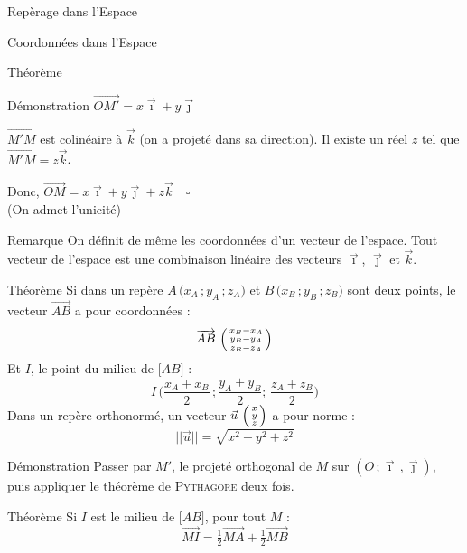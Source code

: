 \documentclass{coursbook}
\begin{document}
\begin{Gpartie}{Repèrage dans l'Espace}
\begin{Spartie}{Coordonnées dans l'Espace}
\begin{SSpartie}{Théorème}
\begin{SSSpartie}{Démonstration}
                    $\overrightarrow{OM'}=x\vec{\imath}+y\vec{\jmath}$

                    $\overrightarrow{M'M}$ est colinéaire à $\vec{k}$ (on a projeté dans sa direction). Il existe un réel $z$ tel que $\overrightarrow{M'M}=z\vec{k}$.

                    Donc, $\overrightarrow{OM}=x\vec{\imath}+y\vec{\jmath}+z\vec{k}\quad\square$ \\
                    (On admet l'unicité)
                \end{SSSpartie}
                \begin{SSSpartie}{Remarque} 
                    On définit de même les coordonnées d'un vecteur de l'espace. Tout vecteur de l'espace est une combinaison linéaire des vecteurs $\vec{\imath}$, $\vec{\jmath}$ et $\vec{k}$.
                \end{SSSpartie}
            \end{SSpartie}
            \begin{SSpartie}{Théorème} 
                Si dans un repère $A\,\big(x_A\,; y_A\,; z_A\big)$ et $B\,\big(x_B\,; y_B\,; z_B\big)$ sont deux points, le vecteur $\overrightarrow{AB}$ a pour coordonnées : 
                \[\overrightarrow{AB}~\begin{psmallmatrix} x_B-x_A \\ y_B-y_A \\ z_B-z_A \end{psmallmatrix}\]
                Et $I$, le point du milieu de $\big[AB\big]$ :
                \[I\,\Bigg(\frac{x_A+x_B}{2}\,;\frac{y_A+y_B}{2};\,\frac{z_A+z_B}{2}\Bigg)\]
                Dans un repère orthonormé, un vecteur $\vec{u}~\begin{psmallmatrix}x \\ y \\ z\end{psmallmatrix}$ a pour norme :
                \[\lvert\lvert\vec{u}\rvert\rvert=\sqrt{x^2+y^2+z^2}\]
                \begin{SSSpartie}{Démonstration} 
                    Passer par $M'$, le projeté orthogonal de $M$ sur $\left(O\,;\vec{\imath}\,,\vec{\jmath}\right)$, puis appliquer le théorème de \textsc{Pythagore} deux fois.
                \end{SSSpartie}
            \end{SSpartie}
            \begin{SSpartie}{Théorème} 
                Si $I$ est le milieu de $\big[AB\big]$, pour tout $M$ :
                \[\overrightarrow{MI}=\tfrac{1}{2}\overrightarrow{MA}+\tfrac{1}{2}\overrightarrow{MB}\]

\end{SSpartie}
\end{Spartie}
\end{Gpartie}
\end{document}
